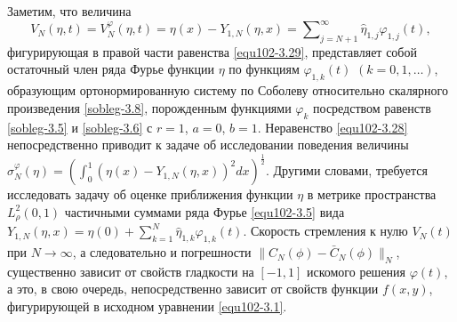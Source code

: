 Заметим,  что величина
\begin{equation}\label{equ102-3.30}
 V_N(\eta,t)=V_N^\varphi(\eta,t)=\eta(x)- Y_{1,N}(\eta,x)
=\sum\nolimits_{j=N+1}^\infty \hat \eta_{1,j}\varphi_{1,j}(t),
\end{equation}
фигурирующая в правой части равенства \eqref{equ102-3.29}, представляет собой остаточный член ряда Фурье функции $\eta$ по функциям $\varphi_{1,k}(t)$ $(k=0,1,\ldots)$, образующим ортонормированную систему по Соболеву относительно скалярного произведения \eqref{sobleg-3.8}, порожденным  функциями $\varphi_k$ посредством равенств \eqref{sobleg-3.5} и \eqref{sobleg-3.6} с $r=1$, $a=0$, $b=1$.  Неравенство \eqref{equ102-3.28} непосредственно приводит к  задаче об исследовании поведения величины $\sigma_N^\varphi(\eta)=(\int_{0}^1(\eta(x)- Y_{1,N}(\eta,x))^2 dx)^\frac12$.
Другими словами, требуется исследовать задачу об оценке приближения функции $\eta$ в метрике пространства $L^2_{\rho}(0,1)$ частичными суммами   ряда Фурье \eqref{equ102-3.5} вида $Y_{1,N}(\eta,x)= \eta(0)+ \sum\nolimits_{k=1}^N \hat \eta_{1,k}\varphi_{1,k}(t).$ Скорость стремления к нулю $V_N(t)$ при $N\to\infty$, а следовательно и погрешности $\|C_N(\phi)- \bar C_N(\phi)\|_N$, существенно зависит от свойств гладкости на $[-1,1]$ искомого решения $\varphi(t)$, а это, в свою очередь, непосредственно зависит от свойств функции $f(x,y)$, фигурирующей в исходном уравнении \eqref{equ102-3.1}.


